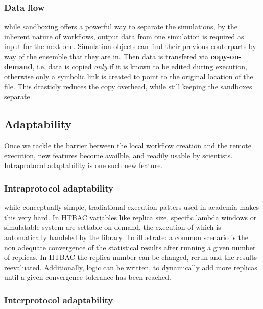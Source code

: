 \subsubsection{Data flow}

while sandboxing offers a powerful way to separate the simulations, by the inherent nature of workflows, output data from one simulation is required as input for the next one. Simulation objects can find their previous couterparts by way of the ensemble that they are in. Then data is transfered via \textbf{copy-on-demand}, i.e. data is copied \emph{only} if it is known to be edited during execution, otherwise only a symbolic link is created to point to the original location of the file. This drasticly reduces the copy overhead, while still keeping the sandboxes separate.

\subsection{Adaptability}

Once we tackle the barrier between the local workflow creation and the remote execution, new features become availble, and readily usable by scientists. Intraprotocol adaptability is one such new feature.

\subsubsection{Intraprotocol adaptability}

while conceptually simple, tradiational execution patters used in academia makes this very hard. In HTBAC variables like replica size, specific lambda windows or simulatable system are settable on demand, the execution of which is automatically handeled by the library. To illustrate: a common scenario is the non adequate convergence of the statistical results after running a given number of replicas. In HTBAC the replica number can be changed, rerun and the results reevaluated. Additionally, logic can be written, to dynamically add more replicas until a given convergence tolerance has been reached.

\subsubsection{Interprotocol adaptability}
